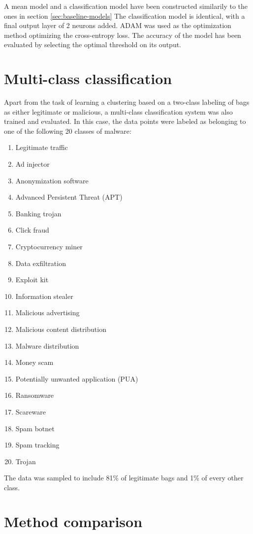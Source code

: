 A mean model and a classification model have been constructed similarily to the ones in section \ref{sec:baseline-models}
The classification model is identical, with a final output layer of 2 neurons added. ADAM was used as the optimization method optimizing the cross-entropy loss. The accuracy of the model has been evaluated by selecting the optimal threshold on its output.

\section{Multi-class classification}
Apart from the task of learning a clustering based on a two-class labeling of bags as either legitimate or malicious, a multi-class classification system was also trained and evaluated. In this case, the data points were labeled as belonging to one of the following 20 classes of malware:

\begin{enumerate}
  \item Legitimate traffic
  \item Ad injector
  \item Anonymization software
  \item Advanced Persistent Threat (APT)
  \item Banking trojan
  \item Click fraud
  \item Cryptocurrency miner
  \item Data exfiltration
  \item Exploit kit
  \item Information stealer
  \item Malicious advertising
  \item Malicious content distribution
  \item Malware distribution
  \item Money scam
  \item Potentially unwanted application (PUA)
  \item Ransomware
  \item Scareware
  \item Spam botnet
  \item Spam tracking
  \item Trojan
\end{enumerate}

The data was sampled to include 81\% of legitimate bags and 1\% of every other class.

\section{Method comparison}

